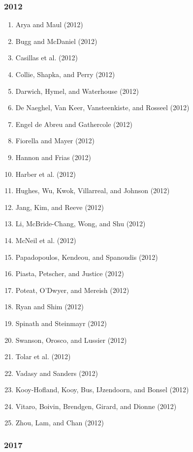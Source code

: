 \documentclass[english,man]{apa6}
\providecommand{\tightlist}{%
  \setlength{\itemsep}{0pt}\setlength{\parskip}{0pt}}
\theoremstyle{definition}
\theoremstyle{definition}
\theoremstyle{definition}
\theoremstyle{remark}
\begin{document}
\subsubsection{2012}\label{section-18}

\begin{enumerate}
\def\labelenumi{\arabic{enumi})}
\tightlist
\item
  Arya and Maul (2012)
\item
  Bugg and McDaniel (2012)
\item
  Casillas et al. (2012)
\item
  Collie, Shapka, and Perry (2012)
\item
  Darwich, Hymel, and Waterhouse (2012)
\item
  De Naeghel, Van Keer, Vansteenkiste, and Rosseel (2012)
\item
  Engel de Abreu and Gathercole (2012)
\item
  Fiorella and Mayer (2012)
\item
  Hannon and Frias (2012)
\item
  Harber et al. (2012)
\item
  Hughes, Wu, Kwok, Villarreal, and Johnson (2012)
\item
  Jang, Kim, and Reeve (2012)
\item
  Li, McBride-Chang, Wong, and Shu (2012)
\item
  McNeil et al. (2012)
\item
  Papadopoulos, Kendeou, and Spanoudis (2012)
\item
  Piasta, Petscher, and Justice (2012)
\item
  Poteat, O'Dwyer, and Mereish (2012)
\item
  Ryan and Shim (2012)
\item
  Spinath and Steinmayr (2012)
\item
  Swanson, Orosco, and Lussier (2012)
\item
  Tolar et al. (2012)
\item
  Vadasy and Sanders (2012)
\item
  Kooy-Hofland, Kooy, Bus, IJzendoorn, and Bonsel (2012)
\item
  Vitaro, Boivin, Brendgen, Girard, and Dionne (2012)
\item
  Zhou, Lam, and Chan (2012)
\end{enumerate}

\subsubsection{2017}\label{section-19}
\end{document}
